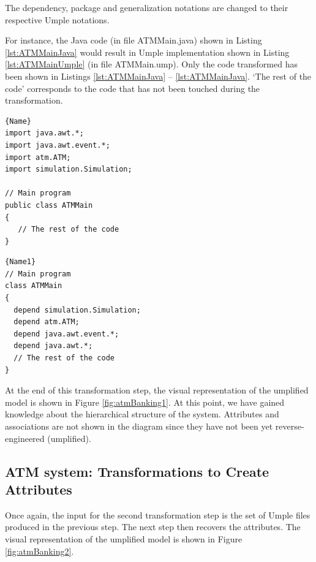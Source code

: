 The dependency, package and generalization notations are changed to their respective Umple notations.

For instance, the Java code (in file ATMMain.java) shown in Listing  \ref{lst:ATMMainJava} would result in  Umple implementation shown in Listing  \ref{lst:ATMMainUmple} (in file ATMMain.ump). Only the code transformed has been shown in Listings \ref{lst:ATMMainJava} -- \ref{lst:ATMMainJava}. `The rest of the code' corresponds to the code that has not been touched during the transformation. 

\noindent\begin{minipage}{.45\textwidth}
\begin{lstlisting}[style=java,caption=ATMMain.java,label=lst:ATMMainJava]{Name}
import java.awt.*;
import java.awt.event.*;
import atm.ATM;
import simulation.Simulation;

// Main program  
public class ATMMain
{
   // The rest of the code
}
\end{lstlisting}
\end{minipage}\hfill
\begin{minipage}{.45\textwidth}
\begin{lstlisting}[style=UmpleIn,caption=ATMMain.ump,label=lst:ATMMainUmple]{Name1}
// Main program  
class ATMMain
{
  depend simulation.Simulation;
  depend atm.ATM;
  depend java.awt.event.*;
  depend java.awt.*;
  // The rest of the code
}
\end{lstlisting}
\end{minipage}

At the end of this transformation step, the visual representation of the umplified model is shown in Figure \ref{fig:atmBanking1}. At this point, we have gained knowledge about the hierarchical structure of the system. Attributes and associations are not shown in the diagram since they have not been yet reverse-engineered (umplified).

\subsection{ATM system: Transformations to Create Attributes}

Once again, the input for the second transformation step is the set of Umple files produced in the previous step. The next step then recovers the attributes. The visual representation of the umplified model is shown in Figure \ref{fig:atmBanking2}.

